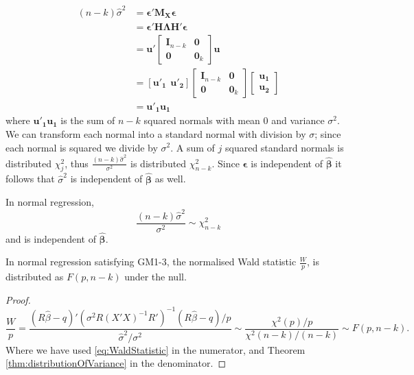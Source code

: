 \documentclass[DIV=14,titlepage=false]{scrreprt}
\begin{document}
\begin{align*}
    (n-k)\hat\sigma^2 &= \boldsymbol{\epsilon}'\mathbf{M_X} \boldsymbol{\epsilon}\\
    &= \boldsymbol{\epsilon}' \mathbf{H}\mathbf{\Lambda} \mathbf{H'} \boldsymbol{\epsilon}\\
    &= \mathbf{u}' \begin{bmatrix}
        \mathbf{I}_{n-k} & \mathbf{0} \\
        \mathbf{0} & \mathbf{0}_k
        \end{bmatrix} \mathbf{u}\\
    &= [\mathbf{u'_1} \hspace{5pt} \mathbf{u'_2}] \begin{bmatrix}
        \mathbf{I}_{n-k} & \mathbf{0} \\
        \mathbf{0} & \mathbf{0}_k
        \end{bmatrix} \begin{bmatrix}
            \mathbf{u_1}\\
            \mathbf{u_2}
        \end{bmatrix}\\
    &=\mathbf{u'_1} \mathbf{u_1}
\end{align*}
where $\mathbf{u'_1} \mathbf{u_1}$ is the sum of $n-k$ squared normals with mean $0$ and variance $\sigma^2$. We can transform each normal into a standard normal with division by $\sigma$; since each normal is squared we divide by $\sigma^2$. A sum of $j$ squared standard normals is distributed $\chi^2_j$, thus $\frac{(n-k)\hat\sigma^2}{\sigma^2}$ is distributed $\chi^2_{n-k}$. Since $\boldsymbol{\epsilon}$ is independent of $\boldsymbol{\hat\beta}$ it follows that $\hat\sigma^2$ is independent of $\boldsymbol{\hat\beta}$ as well.
\begin{theorem} 
In normal regression, \[\frac{(n-k)\hat\sigma^2}{\sigma^2}\sim\chi^2_{n-k}\] and is independent of $\boldsymbol{\hat\beta}$.
\label{thm:distributionOfVariance}
\end{theorem}
\begin{corollary}
    In normal regression satisfying GM1-3, the normalised Wald statistic $\frac{W}{p}$, is distributed as $F(p,n-k)$ under the null.
\end{corollary}
\begin{proof}
    \[
\frac{W}{p} = \frac{(R \hat\beta-q)'(\sigma^2R(X'X)^{-1}R')^{-1}(R \hat\beta-q)/p}{\hat\sigma^2/\sigma^2} \sim \frac{\chi^2(p)/p}{\chi^2(n - k)/(n - k)} \sim F(p, n - k).
\]
Where we have used \ref{eq:WaldStatistic} in the numerator, and Theorem \ref{thm:distributionOfVariance} in the denominator.
\end{proof}
\end{document}
